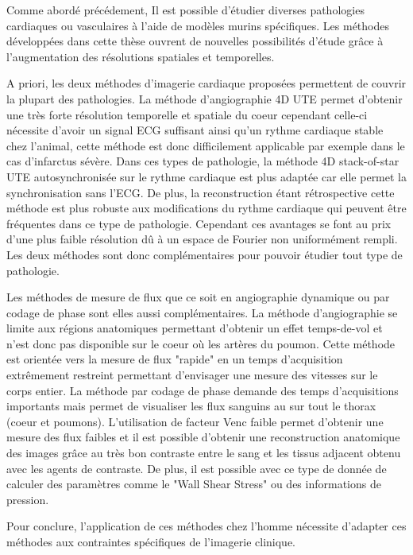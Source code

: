 \medskip
Comme abordé précédement, Il est possible d'étudier diverses pathologies cardiaques ou vasculaires à l'aide de modèles murins spécifiques. Les méthodes développées dans cette thèse ouvrent de nouvelles possibilités d'étude grâce à l'augmentation des résolutions spatiales et temporelles.

A priori, les deux méthodes d'imagerie cardiaque proposées permettent de couvrir la plupart des pathologies. La méthode d'angiographie 4D UTE permet d'obtenir une très forte résolution temporelle et spatiale du coeur cependant celle-ci nécessite d'avoir un signal ECG suffisant ainsi qu'un rythme cardiaque stable chez l'animal, cette méthode est donc difficilement applicable par exemple dans le cas d'infarctus sévère. Dans ces types de pathologie, la méthode 4D stack-of-star UTE autosynchronisée sur le rythme cardiaque est plus adaptée car elle permet la synchronisation sans l'ECG. De plus, la reconstruction étant rétrospective cette méthode est plus robuste aux modifications du rythme cardiaque qui peuvent être fréquentes dans ce type de pathologie. Cependant ces avantages se font au prix d'une plus faible résolution dû à un espace de Fourier non uniformément rempli. Les deux méthodes sont donc complémentaires pour pouvoir étudier tout type de pathologie.

Les méthodes de mesure de flux que ce soit en angiographie dynamique ou par codage de phase sont elles aussi complémentaires. La méthode d'angiographie se limite aux régions anatomiques permettant d'obtenir un effet temps-de-vol et n'est donc pas disponible sur le coeur où les artères du poumon. Cette méthode est orientée vers la mesure de flux "rapide" en un temps d'acquisition extrêmement restreint permettant d'envisager une mesure des vitesses sur le corps entier. La méthode par codage de phase demande des temps d'acquisitions importants mais permet de visualiser les flux sanguins au sur tout le thorax (coeur et poumons). L'utilisation de facteur Venc faible permet d'obtenir une mesure des flux faibles et il est possible d'obtenir une reconstruction anatomique des images grâce au très bon contraste entre le sang et les tissus adjacent obtenu avec les agents de contraste. De plus, il est possible avec ce type de donnée de calculer des paramètres comme le "Wall Shear Stress" ou des informations de pression.

\medskip
Pour conclure, l'application de ces méthodes chez l'homme nécessite d'adapter ces méthodes aux contraintes spécifiques de l'imagerie clinique.

